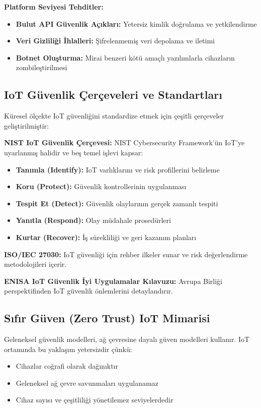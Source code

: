 \textbf{Platform Seviyesi Tehditler:}
\begin{itemize}
    \item \textbf{Bulut API Güvenlik Açıkları:} Yetersiz kimlik doğrulama ve yetkilendirme
    \item \textbf{Veri Gizliliği İhlalleri:} Şifrelenmemiş veri depolama ve iletimi
    \item \textbf{Botnet Oluşturma:} Mirai benzeri kötü amaçlı yazılımlarla cihazların zombileştirilmesi
\end{itemize}

\subsection{IoT Güvenlik Çerçeveleri ve Standartları}

Küresel ölçekte IoT güvenliğini standardize etmek için çeşitli çerçeveler geliştirilmiştir:

\textbf{NIST IoT Güvenlik Çerçevesi:}
NIST Cybersecurity Framework'ün IoT'ye uyarlanmış halidir ve beş temel işlevi kapsar:
\begin{itemize}
    \item \textbf{Tanımla (Identify):} IoT varlıklarını ve risk profillerini belirleme
    \item \textbf{Koru (Protect):} Güvenlik kontrollerinin uygulanması
    \item \textbf{Tespit Et (Detect):} Güvenlik olaylarının gerçek zamanlı tespiti
    \item \textbf{Yanıtla (Respond):} Olay müdahale prosedürleri
    \item \textbf{Kurtar (Recover):} İş sürekliliği ve geri kazanım planları
\end{itemize}

\textbf{ISO/IEC 27030:} IoT güvenliği için rehber ilkeler sunar ve risk değerlendirme metodolojileri içerir.

\textbf{ENISA IoT Güvenlik İyi Uygulamalar Kılavuzu:} Avrupa Birliği perspektifinden IoT güvenlik önlemlerini detaylandırır.

\subsection{Sıfır Güven (Zero Trust) IoT Mimarisi}

Geleneksel güvenlik modelleri, ağ çevresine dayalı güven modelleri kullanır. IoT ortamında bu yaklaşım yetersizdir çünkü:
\begin{itemize}
    \item Cihazlar coğrafi olarak dağınıktır
    \item Geleneksel ağ çevre savunmaları uygulanamaz
    \item Cihaz sayısı ve çeşitliliği yönetilemez seviyelerdedir
\end{itemize}

